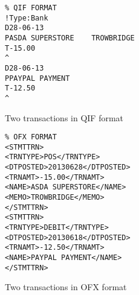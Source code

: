 \begin{figure}
\centering
\begin{lstlisting}
% QIF FORMAT
!Type:Bank
D28-06-13
PASDA SUPERSTORE    TROWBRIDGE
T-15.00
^
D28-06-13
PPAYPAL PAYMENT
T-12.50
^
\end{lstlisting}
\caption{Two transactions in QIF format}

\begin{lstlisting}
% OFX FORMAT
<STMTTRN>
<TRNTYPE>POS</TRNTYPE>
<DTPOSTED>20130628</DTPOSTED>
<TRNAMT>-15.00</TRNAMT>
<NAME>ASDA SUPERSTORE</NAME>
<MEMO>TROWBRIDGE</MEMO>
</STMTTRN>
<STMTTRN>
<TRNTYPE>DEBIT</TRNTYPE>
<DTPOSTED>20130618</DTPOSTED>
<TRNAMT>-12.50</TRNAMT>
<NAME>PAYPAL PAYMENT</NAME>
</STMTTRN>
\end{lstlisting}
\caption{Two transactions in OFX format}
\label{fig:qifofxformat}

\end{figure}
